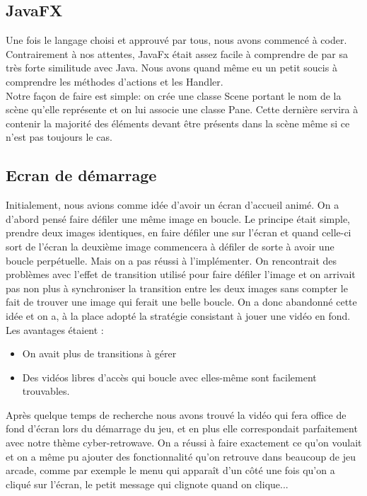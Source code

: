 \documentclass[../main.tex]{subfiles}
\begin{document}
\subsection{JavaFX}
Une fois le langage choisi et approuvé par tous, nous avons commencé à coder.
Contrairement à nos attentes, JavaFx était assez facile à comprendre de par sa très forte similitude avec Java. Nous avons quand même eu un petit soucis à comprendre les méthodes d’actions et les Handler. \\

Notre façon de faire est simple: on crée une classe Scene portant le nom de la scène qu’elle représente et on lui associe une classe Pane.
Cette dernière servira à contenir la majorité des éléments devant être présents dans la scène même si ce n’est pas toujours le cas.

\subsection{Ecran de démarrage}
Initialement, nous avions comme idée d’avoir un écran d'accueil animé. On a d’abord pensé faire défiler une même image en boucle.
Le principe était simple, prendre deux images identiques, en faire défiler une sur l’écran et quand celle-ci sort de l’écran la deuxième image commencera à défiler de sorte à avoir une boucle perpétuelle.
Mais on a pas réussi à l'implémenter. On rencontrait des problèmes avec l’effet de transition utilisé pour faire défiler l’image et on arrivait pas non plus à synchroniser la transition entre les deux images sans compter le fait de trouver une image qui ferait une belle boucle.
On a donc abandonné cette idée et on a, à la place adopté la stratégie consistant à jouer une vidéo en fond. Les avantages étaient :
\begin{itemize}
    \item On avait plus de transitions à gérer 
    \item Des vidéos libres d’accès qui boucle avec elles-même sont facilement trouvables.
\end{itemize}
Après quelque temps de recherche nous avons trouvé la vidéo qui fera office de fond d’écran lors du démarrage du jeu, et en plus elle correspondait parfaitement avec notre thème cyber-retrowave.
On a réussi à faire exactement ce qu’on voulait et on a même pu ajouter des fonctionnalité qu’on retrouve dans beaucoup de jeu arcade, comme par exemple le menu qui apparaît d’un côté une fois qu’on a cliqué sur l'écran, le petit message qui clignote quand on clique...
\end{document}
